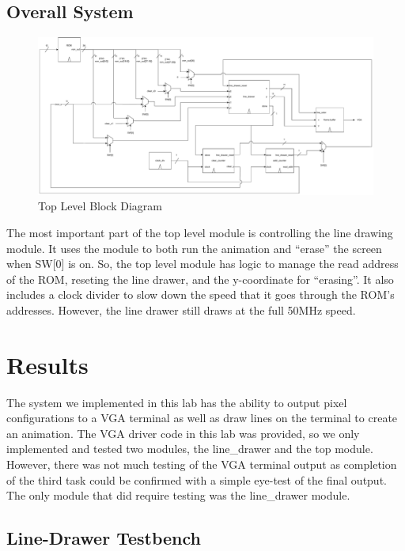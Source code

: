 \documentclass[11pt, titlepage]{article}
\begin{document}
        \subsection{Overall System}
            \begin{figure}[H]
                \centering
                \includegraphics[scale = 0.34]{Images/top level block diagram.pdf}
                \caption{Top Level Block Diagram}
            \end{figure}

            The most important part of the top level module is controlling the line drawing module. It uses the module to both run the animation and ``erase'' the screen when SW[0] is on. So, the top level module has logic to manage the read address of the ROM, reseting the line drawer, and the y-coordinate for ``erasing''. It also includes a clock divider to slow down the speed that it goes through the ROM's addresses. However, the line drawer still draws at the full 50MHz speed.

    \newpage
    \section{Results}
        The system we implemented in this lab has the ability to output pixel configurations to a VGA terminal as well as draw lines on the terminal to create an animation. The VGA driver code in this lab was provided, so we only implemented and tested two modules, the line\_drawer and the top module. However, there was not much testing of the VGA terminal output as completion of the third task could be confirmed with a simple eye-test of the final output. The only module that did require testing was the line\_drawer module. 

        \subsection{Line-Drawer Testbench}
            
\end{document}
